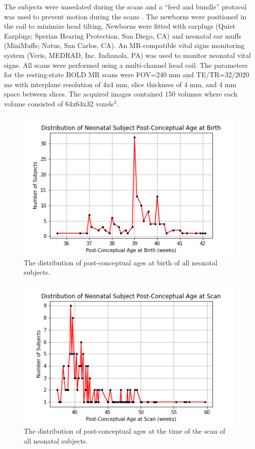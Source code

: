 The subjects were unsedated during the scans and a ``feed and bundle'' protocol was used to prevent motion during the scans \cite{Windram2011}. The newborns were positioned in the coil to minimize head tilting. Newborns were fitted with earplugs (Quiet Earplugs; Sperian Hearing Protection, San Diego, CA) and neonatal ear muffs (MiniMuffs; Natus, San Carlos, CA). An MR-compatible vital signs monitoring system (Veris, MEDRAD, Inc. Indianola, PA) was used to monitor neonatal vital signs. All scans were performed using a multi-channel head coil. The parameters for the resting-state BOLD MR scans were FOV=240 mm and TE/TR=32/2020 ms with interplane resolution of 4x4 mm, slice thickness of 4 mm, and 4 mm space between slices. The acquired images contained 150 volumes where each volume consisted of 64x64x32 voxels$^3$.

\begin{figure}
\centering
\includegraphics[width=.75\textwidth]{5/demo_neonate_subj_pca.png}
\caption{The distribution of post-conceptual ages at birth of all neonatal subjects.}
\label{ch5:neonates:birthpca}
\end{figure}

\begin{figure}
\centering
\includegraphics[width=.75\textwidth]{5/demo_neonate_scan_pca.png}
\caption{The distribution of post-conceptual ages at the time of the scan of all neonatal subjects.}
\label{ch5:neonates:scanpca}
\end{figure}

